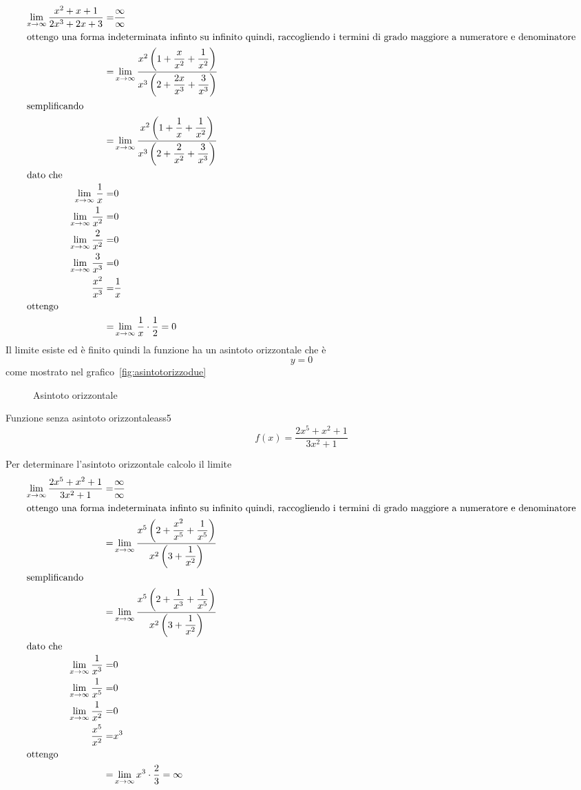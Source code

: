 \begin{align*}\index{Forma!indeterminata!infinito su infinito}
\lim_{x\to \infty}\dfrac{x^2+x+1}{2x^3+2x+3}=&\dfrac{\infty}{\infty}\\
\intertext{ottengo una forma indeterminata infinto su infinito quindi, raccogliendo i termini di grado maggiore a numeratore e denominatore}
=&\lim_{x\to \infty}\dfrac{x^2\left(1+\dfrac{x}{x^2}+\dfrac{1}{x^2}\right)}{x^3\left(2+\dfrac{2x}{x^3}+\dfrac{3}{x^3}\right)}\\
\intertext{semplificando}
=&\lim_{x\to \infty}\dfrac{x^2\left(1+\dfrac{1}{x}+\dfrac{1}{x^2}\right)}{x^3\left(2+\dfrac{2}{x^2}+\dfrac{3}{x^3}\right)}\\
\intertext{dato che}
\lim_{x\to \infty}\dfrac{1}{x}=&0\\
\lim_{x\to \infty}\dfrac{1}{x^2}=&0\\
\lim_{x\to \infty}\dfrac{2}{x^2}=&0\\
\lim_{x\to \infty}\dfrac{3}{x^3}=&0\\
\dfrac{x^2}{x^3}=&\dfrac{1}{x}\\
\intertext{ottengo}
=&\lim_{x\to \infty}\dfrac{1}{x}\cdot\dfrac{1}{2}=0\\
\end{align*}
Il limite esiste ed è finito quindi la funzione ha un asintoto orizzontale che è \[y=0\] come mostrato nel grafico~\vref{fig:asintotorizzodue}
\begin{figure}
	\centering
	
	\captionsetup{format=grafico}
	\caption[Asintoto orizzontale]{Asintoto orizzontale}
	\label{fig:asintotorizzodue}
\end{figure}
\begin{cesempiot}{Funzione senza asintoto orizzontale}{ass5}
	\[f(x)=\dfrac{2x^5+x^2+1}{3x^2+1}\]
\end{cesempiot}
Per determinare l'asintoto orizzontale calcolo il limite 
\begin{align*}\index{Forma!indeterminata!infinito su infinito}
\lim_{x\to \infty}\dfrac{2x^5+x^2+1}{3x^2+1}=&\dfrac{\infty}{\infty}\\
\intertext{ottengo una forma indeterminata infinto su infinito quindi, raccogliendo i termini di grado maggiore a numeratore e denominatore}
=&\lim_{x\to \infty}\dfrac{x^5\left(2+\dfrac{x^2}{x^5}+\dfrac{1}{x^5}\right)}{x^2\left(3+\dfrac{1}{x^2}\right)}\\
\intertext{semplificando}
=&\lim_{x\to \infty}\dfrac{x^5\left(2+\dfrac{1}{x^3}+\dfrac{1}{x^5}\right)}{x^2\left(3+\dfrac{1}{x^2}\right)}\\
\intertext{dato che}
\lim_{x\to \infty}\dfrac{1}{x^3}=&0\\
\lim_{x\to \infty}\dfrac{1}{x^5}=&0\\
\lim_{x\to \infty}\dfrac{1}{x^2}=&0\\
\dfrac{x^5}{x^2}=&x^3\\
\intertext{ottengo}
=&\lim_{x\to \infty}x^3\cdot\dfrac{2}{3}=\infty\\
\end{align*}
